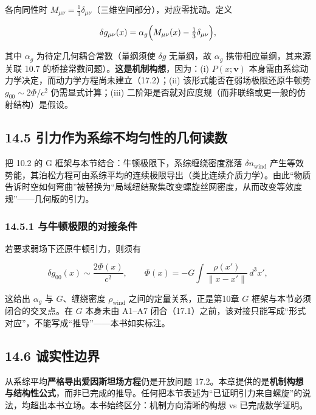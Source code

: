 各向同性时
\(M_{\mu\nu}=\frac{1}{3}\delta_{\mu\nu}\)（三维空间部分），对应零扰动。定义

\[
\delta g_{\mu\nu}(x)=\alpha_g\Bigl(M_{\mu\nu}(x)-\tfrac{1}{3}\delta_{\mu\nu}\Bigr),
\]

其中 \(\alpha_g\) 为待定几何耦合常数（量纲须使 \(\delta g\) 无量纲，故
\(\alpha_g\) 携带相应量纲，其来源关联 10.7
的桥接常数问题）。\textbf{这是机制构想}，因为：(i) \(P(x;\mathbf{v})\)
本身需由系综动力学决定，而动力学方程尚未建立（17.2）；(ii)
该形式能否在弱场极限还原牛顿势 \(g_{00}\sim 2\Phi/c^2\)
仍需显式计算；(iii)
二阶矩是否就对应度规（而非联络或更一般的仿射结构）是假设。

\subsection{14.5
引力作为系综不均匀性的几何读数}\label{ux5f15ux529bux4f5cux4e3aux7cfbux7efcux4e0dux5747ux5300ux6027ux7684ux51e0ux4f55ux8bfbux6570}

把 10.2 的 G 框架与本节结合：牛顿极限下，系综缠绕密度涨落
\(\delta n_{\mathrm{wind}}\)
产生等效势能，其泊松方程可由系综平均的连续极限导出（类比连续介质力学）。由此``物质告诉时空如何弯曲''被替换为``局域纽结聚集改变螺旋丝网密度，从而改变等效度规''------几何版的引力。

\subsubsection{14.5.1
与牛顿极限的对接条件}\label{ux4e0eux725bux987fux6781ux9650ux7684ux5bf9ux63a5ux6761ux4ef6}

若要求弱场下还原牛顿引力，则须有

\[
\delta g_{00}(x)\sim \frac{2\Phi(x)}{c^2},\qquad \Phi(x)=-G\int\frac{\rho(x')}{\|x-x'\|}\,d^3x',
\]

这给出 \(\alpha_g\) 与 \(G\)、缠绕密度 \(\rho_{\mathrm{wind}}\)
之间的定量关系，正是第10章 \(G\) 框架与本节必须闭合的交叉点。在 \(G\)
本身未由 A1--A7
闭合（17.1）之前，该对接只能写成``形式对应''，不能写成``推导''------本书如实标注。

\subsection{14.6 诚实性边界}\label{ux8bdaux5b9eux6027ux8fb9ux754c}

从系综平均\textbf{严格导出爱因斯坦场方程}仍是开放问题
17.2。本章提供的是\textbf{机制构想与结构性公式}，而非已完成的推导。任何把本节表述为``已证明引力来自螺旋''的说法，均超出本书立场。本书始终区分：机制方向清晰的构想
vs 已完成数学证明。

